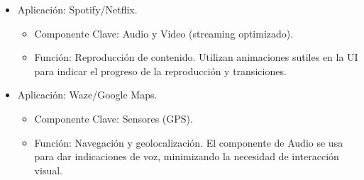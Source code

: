 \documentclass{article}
\begin{document}
\begin{itemize}
    \item  {Aplicación:}  {Spotify/Netflix}.
    \begin{itemize}
        \item  {Componente Clave:}  {Audio} y  {Video} (streaming optimizado).
        \item  {Función:} Reproducción de contenido. Utilizan animaciones sutiles en la UI para indicar el progreso de la reproducción y transiciones.
    \end{itemize}

    \item  {Aplicación:}  {Waze/Google Maps}.
    \begin{itemize}
        \item  {Componente Clave:}  {Sensores (GPS)}.
        \item  {Función:} Navegación y geolocalización. El componente de  {Audio} se usa para dar indicaciones de voz, minimizando la necesidad de interacción visual.
    \end{itemize}

\end{itemize}
\end{document}
